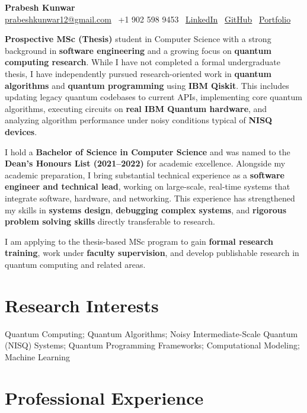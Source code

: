 \documentclass[a4paper,10pt]{article}
\newcommand{\tightvspace}{\vspace{2pt}}
\begin{document}
\begin{center}
    {\LARGE \textbf{Prabesh Kunwar}} \\
    \tightvspace
    \href{mailto:prabeshkunwar12@gmail.com}{prabeshkunwar12@gmail.com} \textbar\ +1 902 598 9453 \textbar\ 
    \href{https://www.linkedin.com/in/prabesh-kunwar/}{LinkedIn} \textbar\ 
    \href{https://github.com/prabeshkunwar12}{GitHub} \textbar\ 
    \href{https://prabeshkunwar12.github.io/portfolio/}{Portfolio}
\end{center}

\noindent \textbf{Prospective MSc (Thesis)} student in Computer Science with a strong background in \textbf{software engineering} and a growing focus on \textbf{quantum computing research}. While I have not completed a formal undergraduate thesis, I have independently pursued research-oriented work in \textbf{quantum algorithms} and \textbf{quantum programming} using \textbf{IBM Qiskit}. This includes updating legacy quantum codebases to current APIs, implementing core quantum algorithms, executing circuits on \textbf{real IBM Quantum hardware}, and analyzing algorithm performance under noisy conditions typical of \textbf{NISQ devices}.

I hold a \textbf{Bachelor of Science in Computer Science} and was named to the \textbf{Dean’s Honours List (2021–2022)} for academic excellence. Alongside my academic preparation, I bring substantial technical experience as a \textbf{software engineer and technical lead}, working on large-scale, real-time systems that integrate software, hardware, and networking. This experience has strengthened my skills in \textbf{systems design}, \textbf{debugging complex systems}, and \textbf{rigorous problem solving skills} directly transferable to research.

I am applying to the thesis-based MSc program to gain \textbf{formal research training}, work under \textbf{faculty supervision}, and develop publishable research in quantum computing and related areas.

\section*{Research Interests}
Quantum Computing; Quantum Algorithms; Noisy Intermediate-Scale Quantum (NISQ) Systems; 
Quantum Programming Frameworks; Computational Modeling; Machine Learning

\section*{Professional Experience}
\end{document}
